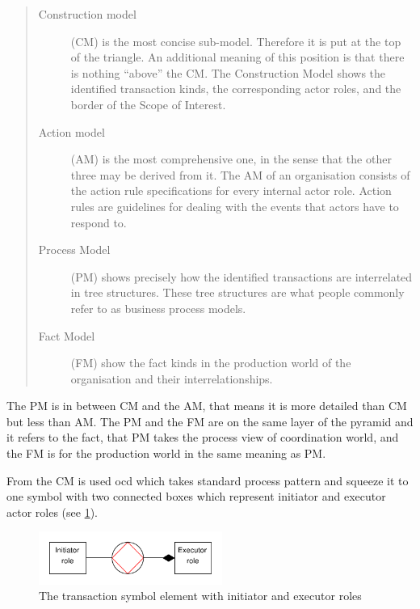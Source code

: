\begin{quote}
	\begin{description}
		\item[Construction model] (CM) is the most concise sub-model. Therefore it is put at the top of the triangle. An additional meaning of this position is that there is nothing ``above'' the CM. The Construction Model shows the identified transaction kinds, the corresponding actor roles, and the border of the Scope of Interest.
         \item[Action model] (AM) is the most comprehensive one, in the sense that the other three may be derived from it. The AM of an organisation consists of the action rule specifications for every internal actor role. Action rules are guidelines for dealing with the events that actors have to respond to.
         
         \item[Process Model] (PM) shows precisely how the identified transactions are interrelated in tree structures. These tree structures are what people commonly refer to as business process models.
         
         \item[Fact Model] (FM) show the fact kinds in the production world of the organisation and their interrelationships. 
	\end{description}
\end{quote}

The PM is in between CM and the AM, that means it is more detailed than CM but less than AM. The PM and the FM are on the same layer of the pyramid and it refers to the fact, that PM takes the process view of coordination world, and the FM is for the production world in the same meaning as PM.

From the CM is used \gls{ocd} which takes standard process pattern and squeeze it to one symbol with two connected boxes which represent initiator and executor actor roles (see \cref{fig:ocd-symbol-example}).

\begin{figure}[ht!]
	\centering
    \includegraphics[width=6cm, keepaspectratio]{img/ocd-symbol-example}
    \caption{The transaction symbol element with initiator and executor roles}
    \label{fig:ocd-symbol-example}
\end{figure}

